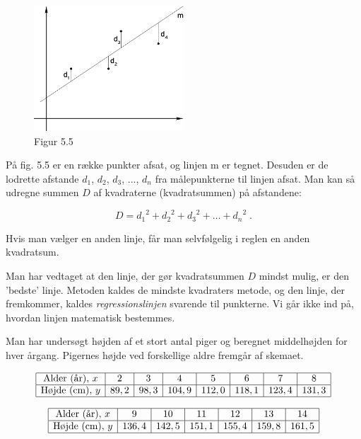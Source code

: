 \documentclass[12pt,oneside,a4paper]{article}
\begin{document}
\begin{figure}[ht]
    \centering
    \includegraphics[width=0.5\textwidth]{fig55}
    \caption{Figur 5.5}
    \label{fig55}
\end{figure}

På fig. 5.5 er en række punkter afsat, og linjen m er tegnet. Desuden er de
lodrette afstande $d_1$, $d_2$, $d_3$, ..., $d_n$ fra målepunkterne til linjen afsat. Man
kan så udregne summen $D$ af kvadraterne (kvadratsummen) på afstandene:

$$
D = {d_1}^2 + {d_2}^2 + {d_3}^2 + \ldots + {d_n}^2 \; . 
$$

Hvis man vælger en anden linje, får man selvfølgelig i reglen en anden kvadratsum.

Man har vedtaget at den linje, der gør kvadratsummen $D$ mindst mulig, er den
'bedste' linje. Metoden kaldes de mindste kvadraters metode, og den linje, der
fremkommer, kaldes {\em regressionslinjen} svarende til punkterne. Vi går ikke ind
på, hvordan linjen matematisk bestemmes. 


Man har undersøgt højden af et stort antal piger og beregnet middel\-høj\-den for
hver årgang. Pigernes højde ved forskellige aldre fremgår af skemaet.

$$
\begin{array}{|c|c|c|c|c|c|c|c|}
    \hline
    \mbox{Alder (år)},\, x &  2 &  3 &  4 &  5 &  6 &  7 &  8 \\
    \hline
    \mbox{Højde (cm)},\, y &  89,2 &   98,3 &   104,9 &  112,0 &  118,1 &  123,4 &  131,3 \\
    \hline
\end{array}
$$

$$
\begin{array}{|c|c|c|c|c|c|c|}
    \hline
    \mbox{Alder (år)},\, x  & 9  & 10 & 11&  12 & 13 & 14 \\
    \hline
    \mbox{Højde (cm)},\, y  & 136,4 &  142,5 &  151,1 &  155,4 &  159,8 &  161,5 \\
    \hline
\end{array}
$$
\end{document}
